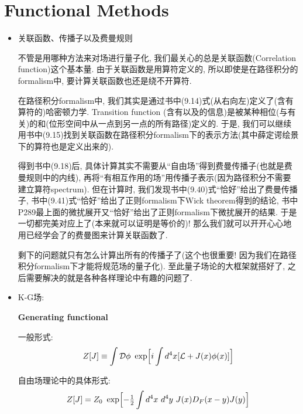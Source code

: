 \chapter{Functional Methods}

\begin{itemize}
  \item 关联函数、传播子以及费曼规则

        不管是用哪种方法来对场进行量子化, 我们最关心的总是关联函数(Correlation function)这个基本量. 由于关联函数是用算符定义的, 所以即使是在路径积分的formalism中, 要计算关联函数也还是绕不开算符.

        在路径积分formalism中, 我们其实是通过书中(9.14)式(从右向左)定义了(含有算符的)哈密顿力学. Transition function (含有以及的信息)是被某种相位(与有关)的和(位形空间中从一点到另一点的所有路径)定义的. 于是, 我们可以继续用书中(9.15)找到关联函数在路径积分formalism下的表示方法(其中薛定谔绘景下的算符也是定义出来的).

        得到书中(9.18)后, 具体计算其实不需要从“自由场”得到费曼传播子(也就是费曼规则中的内线), 再将“有相互作用的场”用传播子表示(因为路径积分不需要建立算符spectrum). 但在计算时, 我们发现书中(9.40)式“恰好”给出了费曼传播子, 书中(9.41)式“恰好”给出了正则formalism下Wick theorem得到的结论, 书中P289最上面的微扰展开又“恰好”给出了正则formalism下微扰展开的结果. 于是一切都完美对应上了(本来就可以证明是等价的)! 那么我们就可以开开心心地用已经学会了的费曼图来计算关联函数了.

        剩下的问题就只有怎么计算出所有的传播子了(这个也很重要! 因为我们在路径积分formalism下才能将规范场的量子化). 至此量子场论的大框架就搭好了, 之后需要解决的就是各种各样理论中有趣的问题了.

        \clearpage

  \item K-G场:

        \textbf{Generating functional}

        一般形式:
        \begin{equation*}
          Z[J]\equiv\int \mathcal{D}\phi\ \exp\Bigl[i\int d^4x[\mathcal{L}+J(x)\phi(x)]\Bigr]
        \end{equation*}

        自由场理论中的具体形式:
        \begin{equation*}
          Z[J] = Z_0\ \exp\Bigl[-\tfrac{1}{2}\int d^4x\ d^4y\ J(x)D_F(x-y)J(y)\Bigr]
        \end{equation*}


\end{itemize}
